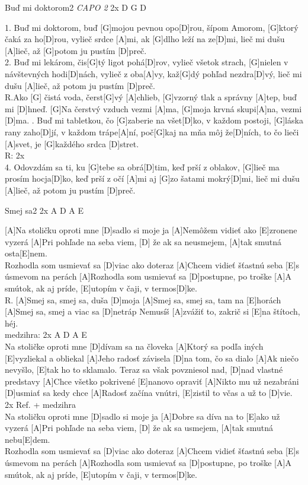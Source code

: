 \documentclass[12pt]{article}
\begin{document}
\begin{song}{Buď mi doktorom}{2}
	\textit{CAPO 2}
	2x D G D
	
	1.
	Buď mi doktorom, 
	buď [G]mojou pevnou opo[D]rou,
	šípom Amorom, [G]ktorý čaká za ho[D]rou,
	vylieč srdce [A]mi, ak [G]dlho leží na ze[D]mi,
	lieč mi dušu [A]lieč, až [G]potom ju pustím [D]preč.
	\\
	2.
	Buď mi lekárom, čis[G]tý ligot pohá[D]rov,
	vylieč všetok strach, 
	[G]nielen v návštevných hodi[D]nách,
	vylieč z oba[A]vy, kaž[G]dý pohľad nezdra[D]vý,
	lieč mi dušu [A]lieč, až potom ju pustím [D]preč.
	\\
	R.Ako [G] čistá voda, čerst[G]vý [A]chlieb,
	[G]vzorný tlak a správny [A]tep,
	buď mi [D]hneď.
	[G]Na čerstvý vzduch vezmi [A]ma,
	[G]moja krvná skupi[A]na,
	vezmi [D]ma.
	.
	Buď mi tabletkou, čo [G]zaberie na všet[D]ko,
	v každom postoji, [G]láska rany zaho[D]jí,
	v každom trápe[A]ní, 
	poč[G]kaj na mňa môj že[D]ních,
	to čo lieči [A]svet, je [G]každého srdca [D]stret.
	\\
	R: 2x
	\\
	4.
	Odovzdám sa ti, ku [G]tebe sa obrá[D]tim,
	keď prší z oblakov, [G]lieč ma prosím hocja[D]ko,
	keď prší z očí [A]mi aj  [G]zo šatami mokrý[D]mi,
	lieč mi dušu [A]lieč, až potom ju pustím [D]preč.
\end{song}

\begin{song}{Smej sa}{2}
	2x A D A E
	
	[A]Na stoličku oproti mne [D]sadlo si moje ja
	[A]Nemôžem vidieť ako [E]zronene vyzerá
	[A]Pri pohľade na seba viem, 
	[D] že ak sa neusmejem,
	[A]tak smutná osta[E]nem.
	\\
	[A]Rozhodla som usmievať sa [D]viac ako doteraz
	[A]Chcem vidieť šťastnú seba 
	[E]s úsmevom na perách
	[A]Rozhodla som usmievať sa 
	[D]postupne, po troške
	[A]A smútok, ak aj príde, 
	[E]utopím v čaji, v termos[D]ke.
	\\
	R.
	[A]Smej sa, smej sa, duša [D]moja
	[A]Smej sa, smej sa, tam na [E]horách
	[A]Smej sa, smej a viac sa [D]netráp
	Nemusíš [A]zvážiť to, zakrič si [E]na štítoch, héj.
	\\
	medzihra: 2x A D A E
	\\
	[A]Na stoličke oproti mne [D]dívam sa na človeka
	[A]Ktorý sa podľa iných [E]vyzliekal a obliekal
	[A]Jeho radosť závisela [D]na tom, čo sa dialo
	[A]Ak niečo nevyšlo, [E]tak ho to sklamalo.
	\columnbreak
	[A]Teraz sa však povzniesol nad, 
	[D]nad vlastné predstavy
	[A]Chce všetko pokrivené [E]nanovo opraviť
	[A]Nikto mu už nezabráni [D]usmiať sa kedy chce
	[A]Radosť začína vnútri, 
	[E]zistil to včas a už to [D]vie.
	\\
	2x Ref. + medzihra
	\\
	[A]Na stoličku oproti mne [D]sadlo si moje ja
	[A]Dobre sa díva na to [E]ako už vyzerá
	[A]Pri pohľade na seba viem, 
	[D] že ak sa usmejem,
	[A]tak smutná nebu[E]dem.
	\\
	[A]Rozhodla som usmievať sa [D]viac ako doteraz
	[A]Chcem vidieť šťastnú seba 
	[E]s úsmevom na perách
	[A]Rozhodla som usmievať sa 
	[D]postupne, po troške
	[A]A smútok, ak aj príde, 
	[E]utopím v čaji, v termos[D]ke.
\end{song}
\end{document}
